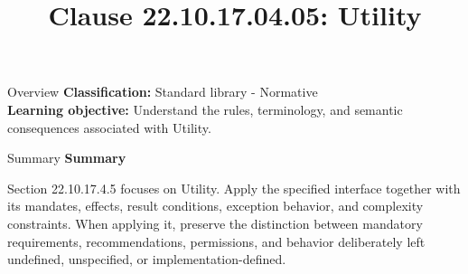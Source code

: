 \documentclass[10pt,letterpaper]{article}
\title{Clause 22.10.17.04.05: Utility}
\author{}
\date{}
\begin{document}
\maketitle
\begin{CornellOverviewBox}{Overview}
\textbf{Classification:} Standard library - Normative\\[2pt]
\textbf{Learning objective:} Understand the rules, terminology, and semantic consequences associated with Utility.
\end{CornellOverviewBox}\begin{CornellSummaryBox}{Summary}
{\sffamily\bfseries\color{Accent} Summary}\par\vspace{3pt}Section 22.10.17.4.5 focuses on Utility. Apply the specified interface together with its mandates, effects, result conditions, exception behavior, and complexity constraints. When applying it, preserve the distinction between mandatory requirements, recommendations, permissions, and behavior deliberately left undefined, unspecified, or implementation-defined.
\end{CornellSummaryBox}
\end{document}
